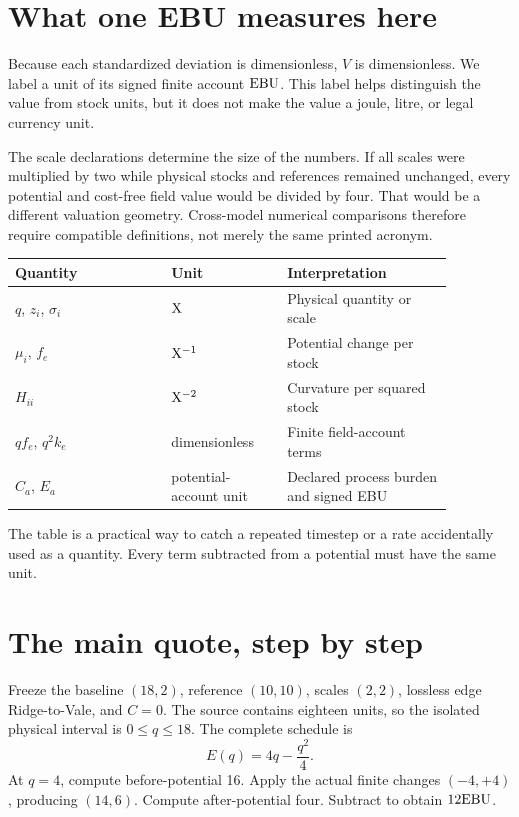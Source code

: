 \section{What one EBU measures here}
Because each standardized deviation is dimensionless, \(V\) is dimensionless. We label a unit of its signed finite account \(\mathrm{EBU}\). This label helps distinguish the value from stock units, but it does not make the value a joule, litre, or legal currency unit.

The scale declarations determine the size of the numbers. If all scales were multiplied by two while physical stocks and references remained unchanged, every potential and cost-free field value would be divided by four. That would be a different valuation geometry. Cross-model numerical comparisons therefore require compatible definitions, not merely the same printed acronym.

\begin{center}
\begin{tabular}{P{0.31\linewidth}P{0.23\linewidth}P{0.33\linewidth}}
\toprule
Quantity & Unit & Interpretation\\
\midrule
\(q\), \(z_i\), \(\sigma_i\) & \(\mathrm{X}\) & Physical quantity or scale\\
\(\mu_i\), \(f_e\) & \(\mathrm{X}^{-1}\) & Potential change per stock\\
\(H_{ii}\) & \(\mathrm{X}^{-2}\) & Curvature per squared stock\\
\(qf_e\), \(q^2k_e\) & dimensionless & Finite field-account terms\\
\(C_a\), \(E_a\) & potential-account unit & Declared process burden and signed EBU\\
\bottomrule
\end{tabular}
\end{center}
The table is a practical way to catch a repeated timestep or a rate accidentally used as a quantity. Every term subtracted from a potential must have the same unit.

\section{The main quote, step by step}
Freeze the baseline \((18,2)\), reference \((10,10)\), scales \((2,2)\), lossless edge Ridge-to-Vale, and \(C=0\). The source contains eighteen units, so the isolated physical interval is \(0\leq q\leq18\). The complete schedule is
\begin{equation}
 E(q)=4q-\frac{q^2}{4}.
\end{equation}
At \(q=4\), compute before-potential 16. Apply the actual finite changes \((-4,+4)\), producing \((14,6)\). Compute after-potential four. Subtract to obtain \(12\mathrm{EBU}\).

